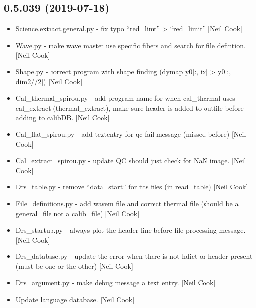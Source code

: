 \documentclass[a4paper,10pt,english]{report}
\begin{document}
\subsection{0.5.039 (2019-07-18)}
\label{\detokenize{misc/changelog:id101}}\begin{itemize}
\item {} 
Science.extract.general.py - fix typo “red\_limt” \textendash{}\textgreater{} “red\_limit” {[}Neil
Cook{]}

\item {} 
Wave.py - make wave master use specific fibers and search for file
defintion. {[}Neil Cook{]}

\item {} 
Shape.py - correct program with shape finding (dymap y0{[}:, ix{]} \textendash{}\textgreater{}
y0{[}:, dim2//2{]}) {[}Neil Cook{]}

\item {} 
Cal\_thermal\_spirou.py - add program name for when cal\_thermal uses
cal\_extract (thermal\_extract), make sure header is added to outfile
before adding to calibDB. {[}Neil Cook{]}

\item {} 
Cal\_flat\_spirou.py - add textentry for qc fail message (missed before)
{[}Neil Cook{]}

\item {} 
Cal\_extract\_spirou.py - update QC should just check for NaN image.
{[}Neil Cook{]}

\item {} 
Drs\_table.py - remove “data\_start” for fits files (in read\_table)
{[}Neil Cook{]}

\item {} 
File\_definitions.py - add wavem file and correct thermal file (should
be a general\_file not a calib\_file) {[}Neil Cook{]}

\item {} 
Drs\_startup.py - always plot the header line before file processing
message. {[}Neil Cook{]}

\item {} 
Drs\_database.py - update the error when there is not hdict or header
present (must be one or the other) {[}Neil Cook{]}

\item {} 
Drs\_argument.py - make debug message a text entry. {[}Neil Cook{]}

\item {} 
Update language database. {[}Neil Cook{]}


\end{itemize}
\end{document}
